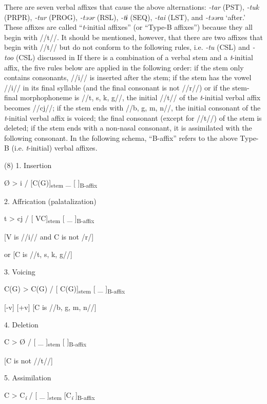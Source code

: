 There are seven verbal affixes that cause the above alternations: \textit{{}-tar} (PST), \textit{{}-tuk} (PRPR), \textit{{}-tur} (PROG), \textit{{}-təər} (RSL), \textit{-tɨ} (SEQ), \textit{{}-tai} (LST), and \textit{{}-təəra} ‘after.’ These affixes are called “\textit{t}{}-initial affixes” (or “Type-B affixes”) because they all begin with //t//. It should be mentioned, however, that there are two affixes that begin with //t// but do not conform to the following rules, i.e. \textit{{}-tu} (CSL) and \textit{{}-too} (CSL) discussed in  If there is a combination of a verbal stem and a \textit{t}{}-initial affix, the five rules below are applied in the following order:  if the stem only contains consonants, //i// is inserted after the stem;  if the stem has the vowel //i// in its final syllable (and the final consonant is not //r//) or if the stem-final morphophoneme is //t, s, k, g//, the initial //t// of the \textit{t}{}-initial verbal affix becomes //cj//;  if the stem ends with //b, g, m, n//, the initial consonant of the \textit{t}{}-initial verbal affix is voiced;  the final consonant (except for //t//) of the stem is deleted;  if the stem ends with a non-nasal consonant, it is assimilated with the following consonant. In the following schema, “B-affix” refers to the above Type-B (i.e. \textit{t}{}-initial) verbal affixes.

(8)  1.  Insertion

    Ø  >  i  /  [C(G)]\textsubscript{stem}  \_  [   ]\textsubscript{B-affix}

  2.  Affrication (palatalization)

    t  >  cj  /  [   VC]\textsubscript{stem}  [ \_  ]\textsubscript{B-affix}

            [V is //i// and C is not /r/]

or [C is //t, s, k, g//]    

  3.  Voicing

    C(G)  >  C(G)  /  [   C(G)]\textsubscript{stem}  [ \_  ]\textsubscript{B-affix}

    [-v]    [+v]    [C is //b, g, m, n//]    

  4.  Deletion

    C  >  Ø  /  [   \_ ]\textsubscript{stem}  [   ]\textsubscript{B-affix}

    [C is not //t//]      

  5.  Assimilation

    C  >  C\textit{\textsubscript{i}}  /  [   \_ ]\textsubscript{stem}  [C\textit{\textsubscript{i}}  ]\textsubscript{B-affix}


